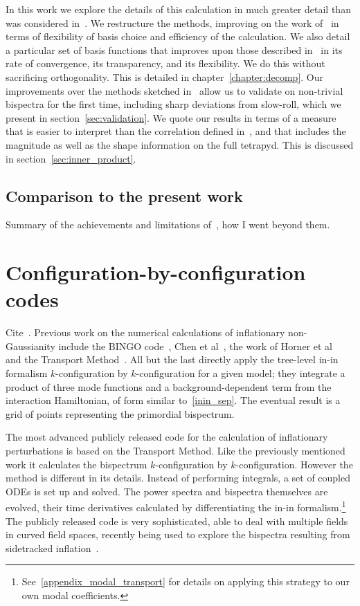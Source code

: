 In this work we explore the details of this calculation in much greater detail
than was considered in~\cite{Funakoshi}.
We restructure the methods, improving on the work of~\cite{Funakoshi} in terms
of flexibility of basis choice and efficiency of the calculation.
We also detail a particular set of basis functions that improves upon those described
in~\cite{Funakoshi} in its rate of convergence, its transparency,
and its flexibility.
We do this without sacrificing orthogonality.
This is detailed in chapter~\ref{chapter:decomp}.
Our improvements over the methods sketched in~\cite{Funakoshi} allow us to validate
on non-trivial bispectra for the first time, including sharp deviations from slow-roll, which we present in
section~\ref{sec:validation}.
We quote our results in terms of a measure that is
easier to interpret than the correlation defined in~\cite{Funakoshi},
and that includes the magnitude as well as the shape information
on the full tetrapyd.
This is discussed in section~\ref{sec:inner_product}.
    \subsection{Comparison to the present work}
    Summary of the achievements and limitations of~\cite{Funakoshi}, how I went beyond them.
    \section{Configuration-by-configuration codes}
    Cite~\cite{Ringeval}.
    Previous work on the numerical calculations of inflationary
non-Gaussianity include the BINGO code~\cite{BINGO},
Chen et al~\cite{chen_easther_lim_1,chen_easther_lim_2},
the work of Horner et al~\cite{horner_methods,horner_ng,horner_cs}
and the Transport Method~\cite{transport_main,transport_pytransport,transport_pytransport_2,transport_curved_3_point}.
All but the last directly apply the tree-level in-in formalism $k$-configuration by $k$-configuration for a given model;
they integrate a product of three mode functions and a background-dependent term from the interaction Hamiltonian, of form similar to~\eqref{inin_sep}.
The eventual result is a grid of points representing the primordial bispectrum.


The most advanced publicly released code for the calculation of inflationary perturbations
is based on the Transport Method.
Like the previously mentioned work it calculates the bispectrum $k$-configuration by $k$-configuration.
However the method is different in its details.
Instead of performing integrals,
a set of coupled ODEs is set up and solved.
The power spectra and bispectra themselves are evolved, their time derivatives calculated by
differentiating the in-in formalism.\footnote{See~\ref{appendix_modal_transport}
    for details on applying this strategy to our own modal coefficients.
    }
The publicly released code is very sophisticated,
able to deal with multiple fields in curved field spaces,
recently being used to explore the bispectra resulting from
sidetracked inflation~\cite{RP_1}.
